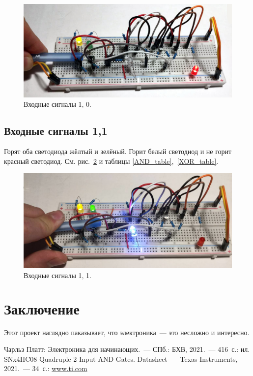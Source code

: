 \documentclass[a4paper,12pt]{article}
\begin{document}
\begin{figure}[H]
    \begin{center}
    \includegraphics[width=\textwidth]{state10}    
    \caption{Входные сигналы 1, 0.}
    \label{state10}
    \end{center}
\end{figure}

\subsection{Входные сигналы 1,1}

Горят оба светодиода жёлтый и зелёный. Горит белый светодиод и не горит красный светодиод. См. рис.~\ref{state11} и таблицы \ref{AND_table},~\ref{XOR_table}.

\begin{figure}[H]
    \begin{center}
    \includegraphics[width=\textwidth]{state11}    
    \caption{Входные сигналы 1, 1.}
    \label{state11}
    \end{center}
\end{figure}


\section{Заключение}

Этот проект наглядно паказывает, что электроника~--- это несложно и интересно.  


\listoffigures

\listoftables

\begin{thebibliography}{9}
    \bibitem{}Чарльз Платт: Электроника для начинающих.~--- СПб.: БХВ, 2021.~--- 416~с.: ил.
    SNx4HC08 Quadruple 2-Input AND Gates. Datasheet~--- Texas Instruments, 2021.~--- 34~с.: \url{www.ti.com}
\end{thebibliography}
\end{document}
